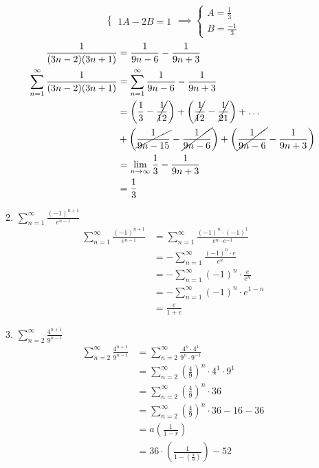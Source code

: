 \documentclass[12pt,letterpaper]{article}
\newcommand{\limx}[2]{\displaystyle\lim\limits_{#1 \to #2}}
\theoremstyle{case}
\theoremstyle{definition}
\begin{document}
\begin{enumerate}
\begin{enumerate}
\[\begin{cases}
			1A-2B=1
			\end{cases} \implies \begin{cases}
			A=\frac{1}{3} \\
			B=\frac{-1}{3}
			\end{cases}\]
			\begin{align*}
				\frac{1}{(3n-2)(3n+1)} &= \frac{1}{9n-6} - \frac{1}{9n+3} \\
				\sum_{n=1}^{\infty} \frac{1}{(3n-2)(3n+1)} &= \sum_{n=1}^{\infty} \frac{1}{9n-6} - \frac{1}{9n+3} \\
				&= \left(\frac{1}{3}-\cancel{\frac{1}{12}}\right) + \left(\cancel{\frac{1}{12}}-\cancel{\frac{1}{21}}\right) + \dots\\
				&+ \left(\cancel{\frac{1}{9n-15}}-\cancel{\frac{1}{9n-6}}\right) + \left(\cancel{\frac{1}{9n-6}}-\frac{1}{9n+3}\right) \\
				&= \limx{n}{\infty} \frac{1}{3}-\frac{1}{9n+3} \\
				&= \frac{1}{3}
			\end{align*}
			\item $\displaystyle\sum_{n=1}^{\infty} \frac{(-1)^{n+1}}{e^{n-1}}$
			\begin{align*}
				\sum_{n=1}^{\infty} \frac{(-1)^{n+1}}{e^{n-1}} &= \sum_{n=1}^{\infty} \frac{(-1)^n \cdot (-1)^1}{e^n\cdot e^{-1}} \\
				&=- \sum_{n=1}^{\infty} \frac{(-1)^n \cdot e}{e^n} \\
				&= - \sum_{n=1}^{\infty} (-1)^n \cdot \frac{e}{e^n} \\
				&= - \sum_{n=1}^{\infty} (-1)^n \cdot e^{1-n} \\
				&= \frac{e}{1+e}
			\end{align*}
			\item $\displaystyle\sum_{n=2}^{\infty} \frac{4^{n+1}}{9^{n-1}}$
			\begin{align*}
				\sum_{n=2}^{\infty} \frac{4^{n+1}}{9^{n-1}} &= \sum_{n=2}^{\infty} \frac{4^n \cdot 4^1}{9^n\cdot 9^{-1}} \\
				&= \sum_{n=2}^{\infty} \left(\frac{4}{9}\right)^n \cdot 4^1 \cdot 9^1 \\
				&= \sum_{n=2}^{\infty} \left(\frac{4}{9}\right)^n \cdot 36 \\
				&= \sum_{n=2}^{\infty} \left(\frac{4}{9}\right)^n \cdot 36 - 16-36 \\
				&= a\left(\frac{1}{1-r}\right) \\
				&= 36 \cdot \left(\frac{1}{1-\left(\frac{4}{9}\right)}\right) -52 \\

\end{align*}
\end{enumerate}
\end{enumerate}
\end{document}
